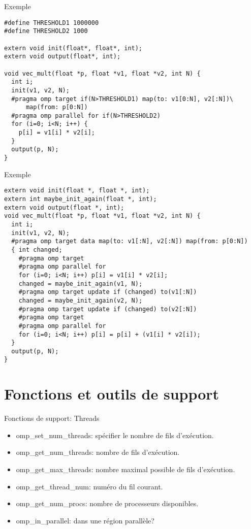 \documentclass[10pt]{beamer}
\begin{document}
\begin{frame}[fragile]{Exemple}

  \scriptsize
  \begin{verbatim}
#define THRESHOLD1 1000000
#define THRESHOLD2 1000

extern void init(float*, float*, int);
extern void output(float*, int);

void vec_mult(float *p, float *v1, float *v2, int N) {
  int i;
  init(v1, v2, N);
  #pragma omp target if(N>THRESHOLD1) map(to: v1[0:N], v2[:N])\
      map(from: p[0:N])
  #pragma omp parallel for if(N>THRESHOLD2)
  for (i=0; i<N; i++) {
    p[i] = v1[i] * v2[i];
  }
  output(p, N);
}
  \end{verbatim}
\end{frame}

\begin{frame}[fragile]{Exemple}

  \scriptsize
  \begin{verbatim}
extern void init(float *, float *, int);
extern int maybe_init_again(float *, int);
extern void output(float *, int);
void vec_mult(float *p, float *v1, float *v2, int N) {
  int i;
  init(v1, v2, N);
  #pragma omp target data map(to: v1[:N], v2[:N]) map(from: p[0:N])
  { int changed;
    #pragma omp target
    #pragma omp parallel for
    for (i=0; i<N; i++) p[i] = v1[i] * v2[i];
    changed = maybe_init_again(v1, N);
    #pragma omp target update if (changed) to(v1[:N])
    changed = maybe_init_again(v2, N);
    #pragma omp target update if (changed) to(v2[:N])
    #pragma omp target
    #pragma omp parallel for
    for (i=0; i<N; i++) p[i] = p[i] + (v1[i] * v2[i]);
  }
  output(p, N);
}
  \end{verbatim}
\end{frame}

\section{Fonctions et outils de support}

\begin{frame}[fragile]{Fonctions de support: Threads}

  \begin{itemize}
    \item omp\_set\_num\_threads: spécifier le nombre de fils d'exécution.

    \item omp\_get\_num\_threads: nombre de fils d'exécution.

    \item omp\_get\_max\_threads: nombre maximal possible de fils d'exécution.

    \item omp\_get\_thread\_num: numéro du fil courant.

    \item omp\_get\_num\_procs: nombre de processeurs disponibles.

    \item omp\_in\_parallel: dans une région parallèle?
  \end{itemize}
\end{frame}
\end{document}
